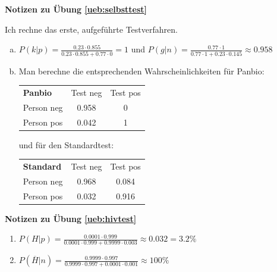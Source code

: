 \documentclass[%
<<<<<<< Updated upstream
<<<<<<< Updated upstream
11pt,%
twoside,%
titlepage,%
german,%
=======
=======
>>>>>>> Stashed changes
11pt,%
twoside,%
titlepage,%
swissgerman,%
<<<<<<< Updated upstream
>>>>>>> Stashed changes
=======
>>>>>>> Stashed changes
headsepline%
]{scrartcl}
\newcommand{\faReturnGray}{\textcolor{gray}{\faMailReply}} %
\newcommand{\spaltenheight}{\rule{0mm}{3ex}}
\newcommand{\spaltensep}{\\[1ex]}
\theoremstyle{definition}
\theoremstyle{plain}
\newcommand{\concatueb}[1]{ueb:#1}%
\newcommand{\concatlsg}[1]{lsg:#1}%
\newenvironment{lsg}[1]{%
    \par\noindent\textbf{Notizen zu Übung \ref{\concatueb{#1}}}\label{\concatlsg{#1}}
    \hfill\hyperref[\concatueb{#1}]{\faReturnGray}\par %
}{%
    \par%
}
\newcommand{\concatueb}[1]{ueb:#1}%
\newcommand{\concatlsg}[1]{lsg:#1}%
\newenvironment{lsg}[1]{%
    \par\noindent\textbf{Notizen zu Übung \ref{\concatueb{#1}}.}%
    \label{\concatlsg{#1}}
}{%
    \par%
}
\begin{document}
\begin{lsg}{selbsttest}
Ich rechne das erste, aufgeführte Testverfahren.
    \begin{enumerate}[a)]
        \item $P(k|p)=\frac{0.23\cdot0.855}{0.23\cdot0.855+0.77\cdot0}=1$ und $P(g|n)=\frac{0.77\cdot1}{0.77\cdot1+0.23\cdot0.145}\approx0.958$

        \item Man berechne die entsprechenden Wahrscheinlichkeiten für Panbio:\\
        
        \begin{table}[h!]
\begin{center}
\begin{tabular}{|l|c|c|}
\hline
\rowcolor{Gray}\spaltenheight \textbf{Panbio} & Test neg & Test pos \spaltensep \hhline{|-|-|-|}
\rowcolor{lightyellow}\spaltenheight  Person neg & 0.958 & 0 \spaltensep \hhline{|-|-|-|}
\rowcolor{Gray}\spaltenheight  Person pos & 0.042 & 1 \spaltensep \hline
\end{tabular}
\end{center}
\end{table}

und für den Standardtest:\\
        
        \begin{table}[h!]
\begin{center}
\begin{tabular}{|l|c|c|}
\hline
\rowcolor{Gray}\spaltenheight \textbf{Standard} & Test neg & Test pos \spaltensep \hhline{|-|-|-|}
\rowcolor{lightyellow}\spaltenheight  Person neg & 0.968 & 0.084 \spaltensep \hhline{|-|-|-|}
\rowcolor{Gray}\spaltenheight  Person pos & 0.032 & 0.916 \spaltensep \hline
\end{tabular}
\end{center}
\end{table}
    \end{enumerate}
\end{lsg}
\begin{lsg}{hivtest}
\begin{enumerate}
    \item $P(H|p)=\frac{0.0001\cdot0.999}{0.0001\cdot0.999+0.9999\cdot0.003}\approx0.032=3.2\%$
    \item $P(\overline{H}|n)=\frac{0.9999\cdot0.997}{0.9999\cdot0.997+0.0001\cdot0.001}\approx100\%$
\end{enumerate}
\end{lsg}
\end{document}
